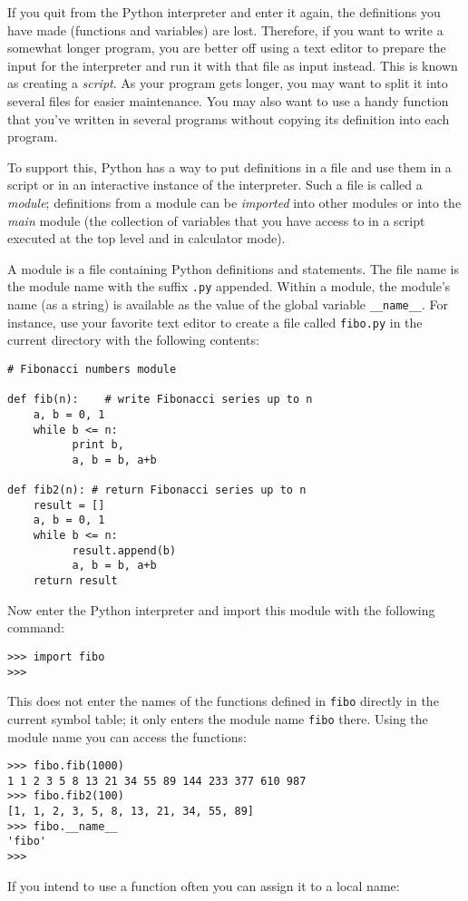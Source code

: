 If you quit from the Python interpreter and enter it again, the
definitions you have made (functions and variables) are lost.
Therefore, if you want to write a somewhat longer program, you are
better off using a text editor to prepare the input for the interpreter
and run it with that file as input instead.  This is known as creating a
{\em script}.  As your program gets longer, you may want to split it
into several files for easier maintenance.  You may also want to use a
handy function that you've written in several programs without copying
its definition into each program.

To support this, Python has a way to put definitions in a file and use
them in a script or in an interactive instance of the interpreter.
Such a file is called a {\em module}; definitions from a module can be
{\em imported} into other modules or into the {\em main} module (the
collection of variables that you have access to in a script
executed at the top level
and in calculator mode).

A module is a file containing Python definitions and statements.  The
file name is the module name with the suffix {\tt .py} appended.  Within
a module, the module's name (as a string) is available as the value of
the global variable {\tt __name__}.  For instance, use your favorite text
editor to create a file called {\tt fibo.py} in the current directory
with the following contents:

\bcode\begin{verbatim}
# Fibonacci numbers module

def fib(n):    # write Fibonacci series up to n
    a, b = 0, 1
    while b <= n:
          print b,
          a, b = b, a+b

def fib2(n): # return Fibonacci series up to n
    result = []
    a, b = 0, 1
    while b <= n:
          result.append(b)
          a, b = b, a+b
    return result
\end{verbatim}\ecode
%
Now enter the Python interpreter and import this module with the
following command:

\bcode\begin{verbatim}
>>> import fibo
>>> 
\end{verbatim}\ecode
%
This does not enter the names of the functions defined in
{\tt fibo}
directly in the current symbol table; it only enters the module name
{\tt fibo}
there.
Using the module name you can access the functions:

\bcode\begin{verbatim}
>>> fibo.fib(1000)
1 1 2 3 5 8 13 21 34 55 89 144 233 377 610 987
>>> fibo.fib2(100)
[1, 1, 2, 3, 5, 8, 13, 21, 34, 55, 89]
>>> fibo.__name__
'fibo'
>>> 
\end{verbatim}\ecode
%
If you intend to use a function often you can assign it to a local name:

